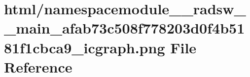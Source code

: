 \hypertarget{namespacemodule____radsw____main__afab73c508f778203d0f4b5181f1cbca9__icgraph_8png}{}\section{html/namespacemodule\+\_\+\+\_\+radsw\+\_\+\+\_\+main\+\_\+afab73c508f778203d0f4b5181f1cbca9\+\_\+icgraph.png File Reference}
\label{namespacemodule____radsw____main__afab73c508f778203d0f4b5181f1cbca9__icgraph_8png}
